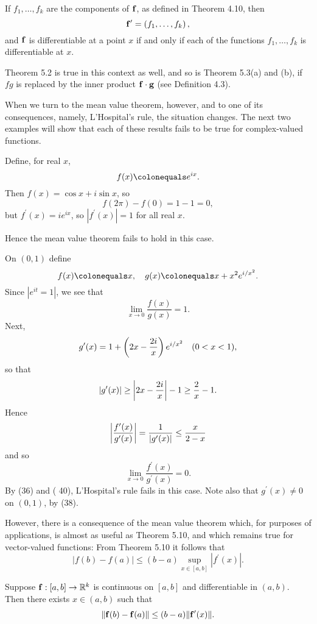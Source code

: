 If $f_1,\dots,f_k$ are the components of $\vb{f}$, as defined in Theorem 4.10, then
\[\vb{f}^\prime=\left(f_1,\dots,f_k\right),\]
and $\vb{f}$ is differentiable at a point $x$ if and only if each of the functions $f_1,\dots,f_k$ is differentiable at $x$.

Theorem 5.2 is true in this context as well, and so is Theorem 5.3(a) and (b), if $fg$ is replaced by the inner product $\vb{f}\cdot\vb{g}$ (see Definition 4.3).

When we turn to the mean value theorem, however, and to one of its consequences, namely, L'Hospital's rule, the situation changes. The next two examples will show that each of these results fails to be true for complex-valued functions.

\begin{example}
Define, for real $x$,
\[f(x)\colonequals e^{ix}.\]
Then $f(x)=\cos x+i\sin x$, so
\[f(2\pi)-f(0)=1-1=0,\]
but $f^\prime(x)=ie^{ix}$, so $|f^\prime(x)|=1$ for all real $x$.

Hence the mean value theorem fails to hold in this case.
\end{example}

\begin{example}
On $(0,1)$ define
\[f(x)\colonequals x,\quad g(x)\colonequals x+x^2 e^{i/x^2}.\]
Since $|e^{it}=1|$, we see that
\[\lim_{x\to0}\frac{f(x)}{g(x)}=1.\]
Next, 
\[g^\prime(x)=1+\left(2x-\frac{2i}{x}\right)e^{i/x^2}\quad(0<x<1),\]
so that
\[|g^\prime(x)|\ge\left|2x-\frac{2i}{x}\right|-1\ge\frac{2}{x}-1.\]
Hence
\[\left|\frac{f^\prime(x)}{g^\prime(x)}\right|=\frac{1}{|g^\prime(x)|}\le\frac{x}{2-x}\]
and so
\[\lim_{x\to0}\frac{f^\prime(x)}{g^\prime(x)}=0.\]
By (36) and ( 40), L'Hospital's rule fails in this case. Note also that $g^\prime(x)\neq0$ on $(0,1)$, by (38). 
\end{example}

However, there is a consequence of the mean value theorem which, for purposes of applications, is almost as useful as Theorem 5.10, and which remains true for vector-valued functions: From Theorem 5.10 it follows that 
\[|f(b)-f(a)|\le(b-a)\sup_{x\in[a,b]}|f^\prime(x)|.\]

\begin{theorem}\label{thrm:mvt-vector-valued-functions}
Suppose $\vb{f}:[a,b]\to\mathbb R^k$ is continuous on $[a,b]$ and differentiable in $(a,b)$. Then there exists $x\in(a,b)$ such that
\begin{equation}
\norm{\vb{f}(b)-\vb{f}(a)}\le(b-a)\norm{\vb{f}^\prime(x)}.
\end{equation}
\end{theorem}

